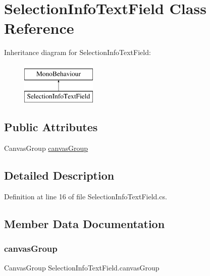 \hypertarget{class_selection_info_text_field}{}\section{Selection\+Info\+Text\+Field Class Reference}
\label{class_selection_info_text_field}
Inheritance diagram for Selection\+Info\+Text\+Field\+:\begin{figure}[H]
\begin{center}
\leavevmode
\includegraphics[height=2.000000cm]{class_selection_info_text_field}
\end{center}
\end{figure}
\subsection*{Public Attributes}
\begin{DoxyCompactItemize}
\item 
Canvas\+Group \hyperlink{class_selection_info_text_field_ac36f3f06e848c35fa077b85c920b8365}{canvas\+Group}
\end{DoxyCompactItemize}


\subsection{Detailed Description}


Definition at line 16 of file Selection\+Info\+Text\+Field.\+cs.



\subsection{Member Data Documentation}
\mbox{\label{class_selection_info_text_field_ac36f3f06e848c35fa077b85c920b8365}} 
\subsubsection{\texorpdfstring{canvas\+Group}{canvasGroup}}
{\footnotesize\ttfamily Canvas\+Group Selection\+Info\+Text\+Field.\+canvas\+Group}



